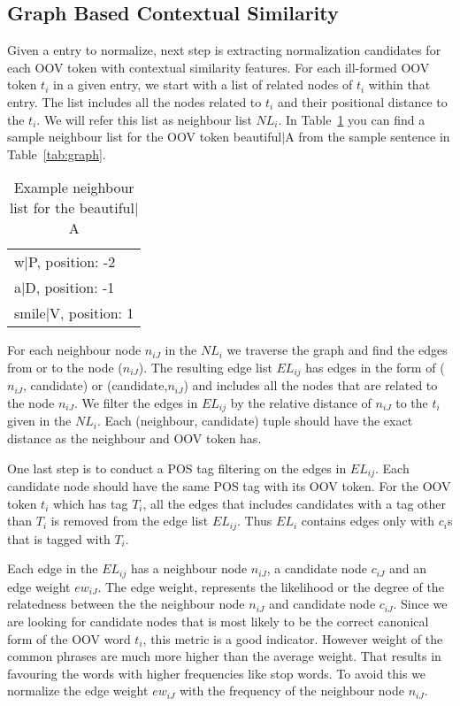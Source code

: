 \subsection{Graph Based Contextual Similarity}

Given a entry to normalize, next step is extracting normalization candidates for each OOV token with contextual similarity features. For each ill-formed OOV token $t_i$ in a given entry, we start with a list of related nodes of $t_i$ within that entry. The list includes all the nodes related to $t_i$ and their positional distance to the $t_i$. We will refer this list as neighbour list $NL_i$. In Table~\ref{tab:neigh} you can find a sample neighbour list for the OOV token beautiful$|$A from the sample sentence in Table~\ref{tab:graph}.

\begin{table}[hbt]
  \centering
  \begin{tabular}[tc]{l}
    w$|$P, position: -2 \\
    a$|$D, position: -1 \\
    smile$|$V, position: 1 \\
  \end{tabular}
\caption{Example neighbour list for the beautiful$|$A}
\label{tab:neigh}
\end{table}


For each neighbour node $n_{iJ}$ in the $NL_i$  we traverse the graph and find the edges from or to the node ($n_{iJ}$). The resulting edge list $EL_{ij}$ has edges in the form of ($n_{iJ}$, candidate) or (candidate,$n_{iJ}$) and includes all the nodes that are related to the node $n_{iJ}$. We filter the edges in $EL_{ij}$ by the relative distance of $n_{iJ}$ to the $t_i$ given in the $NL_i$. Each (neighbour, candidate) tuple should have the exact distance as the neighbour and OOV token has.

One last step is to conduct a POS tag filtering on the edges in $EL_{ij}$. Each candidate node should have the same POS tag with its OOV token. For the OOV token $t_i$ which has tag $T_i$, all the edges that includes candidates with a tag other than $T_i$ is removed from the edge list $EL_{ij}$. Thus $EL_{i}$ contains edges only with $c_{i}$s that is tagged with $T_i$.

Each edge in the $EL_{ij}$ has a neighbour node $n_{iJ}$, a candidate node $c_{iJ}$ and an edge weight $ew_{iJ}$. The edge weight, represents the likelihood or the degree of the relatedness between the the neighbour node $n_{iJ}$ and candidate node $c_{iJ}$. Since we are looking for candidate nodes that is most likely to be the correct canonical form of the OOV word $t_i$, this metric is a good indicator. However weight of the common phrases are much more higher than the average weight. That results in favouring the words with higher frequencies like stop words. To avoid this we normalize the edge weight $ew_{iJ}$ with the frequency of the neighbour node $n_{iJ}$.

